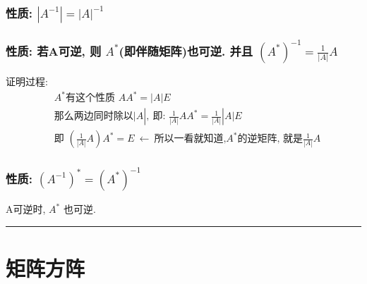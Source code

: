 \documentclass[UTF8]{ctexart}
\begin{document}
\subsubsection{性质: $|A^{-1}|=|A|^{-1}$}


\subsubsection{性质: 若A可逆, 则 $A^{*}$(即伴随矩阵)也可逆. 并且 $(A^{*})^{-1} =  \frac{1}{|A| } A$ }


证明过程:
\begin{align*}
		& A^*\text{有这个性质\ }AA^*=|A|E\\
	& \text{那么两边同时除以|}A|,\ \text{即:\ }\frac{1}{|A|}AA^*=\frac{1}{|A|}|A|E\\
	& \text{即\ }\left( \frac{1}{|A|}A \right) A^*=E\ ←\ \text{所以一看就知道,}A^*\text{的逆矩阵,\ 就是}\frac{1}{|A|}A
\end{align*}



\subsubsection{性质: $\left( A^{-1} \right) ^*=\left( A^* \right) ^{-1}$ }




A可逆时, $A^{*}$ 也可逆.\\

	
	\hrule
	
	\section{矩阵方阵}
\end{document}
